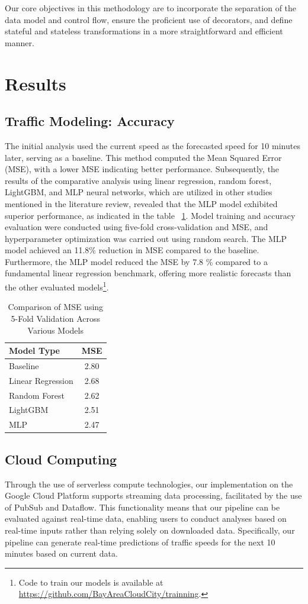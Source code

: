 Our core objectives in this methodology are to incorporate the separation of the data model and control flow, ensure the proficient use of decorators, and define stateful and stateless transformations in a more straightforward and efficient manner.

\section{Results}
\subsection{Traffic Modeling: Accuracy}
The initial analysis used the current speed as the forecasted speed for 10 minutes later, serving as a baseline. This method computed the Mean Squared Error (MSE), with a lower MSE indicating better performance. Subsequently, the results of the comparative analysis using linear regression, random forest, LightGBM, and MLP neural networks, which are utilized in other studies mentioned in the literature review, revealed that the MLP model exhibited superior performance, as indicated in the table ~\ref{table:mse_comparison_transposed}. Model training and accuracy evaluation were conducted using five-fold cross-validation and MSE, and hyperparameter optimization was carried out using random search. The MLP model achieved an 11.8\% reduction in MSE compared to the baseline. Furthermore, the MLP model reduced the MSE by 7.8 \% compared to a fundamental linear regression benchmark, offering more realistic forecasts than the other evaluated models\footnote{Code to train our models is available at \url{https://github.com/BayAreaCloudCity/trainning}.}.

\begin{table}[ht]
\centering
\begin{tabular}{l c}
 \hline
 Model Type & MSE \\
 \hline
 Baseline & 2.80 \\
 Linear Regression & 2.68 \\
 Random Forest & 2.62 \\ 
 LightGBM & 2.51 \\
 MLP & 2.47 \\
 \hline
\end{tabular}
\caption{Comparison of MSE using 5-Fold Validation Across Various Models}
\label{table:mse_comparison_transposed}
\end{table}

\subsection{Cloud Computing}
Through the use of serverless compute technologies, our implementation on the Google Cloud Platform supports streaming data processing, facilitated by the use of PubSub and Dataflow. This functionality means that our pipeline can be evaluated against real-time data, enabling users to conduct analyses based on real-time inputs rather than relying solely on downloaded data. Specifically, our pipeline can generate real-time predictions of traffic speeds for the next 10 minutes based on current data.

